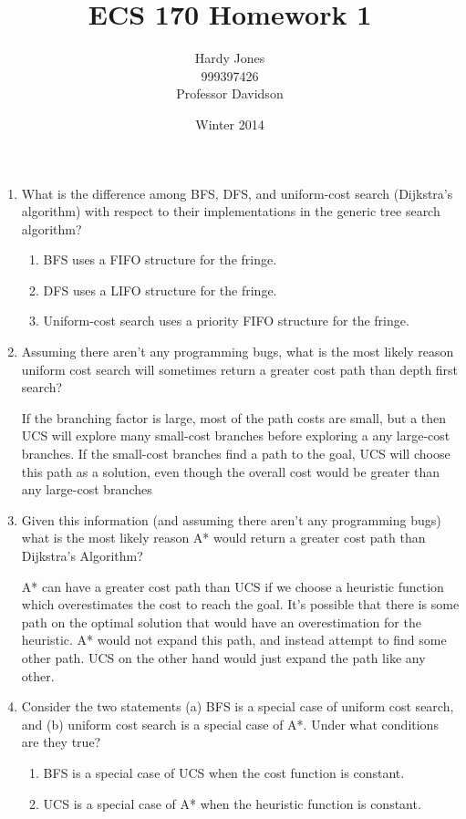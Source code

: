 \documentclass[12pt,letterpaper]{article}
\title{ECS 170 Homework 1\vspace{-2ex}}
\author{Hardy Jones\\
        999397426\\
        Professor Davidson\vspace{-2ex}}
\date{Winter 2014}
\begin{document}
  \maketitle

  \begin{enumerate}
    \item
      What is the difference among
      BFS, DFS, and uniform-cost search (Dijkstra's algorithm)
      with respect to their implementations in the generic tree search algorithm?

      \begin{enumerate}
        \item BFS uses a FIFO structure for the fringe.
        \item DFS uses a LIFO structure for the fringe.
        \item Uniform-cost search uses a priority FIFO structure for the fringe.
      \end{enumerate}
    \item
      Assuming there aren't any programming bugs,
      what is the most likely reason uniform cost search will sometimes return a greater cost path than depth first search?

      If the branching factor is large, most of the path costs are small, but a
      then UCS will explore many small-cost branches before exploring a any large-cost branches.
      If the small-cost branches find a path to the goal,
      UCS will choose this path as a solution,
      even though the overall cost would be greater than any large-cost branches
    \item
      Given this information (and assuming there aren't any programming bugs)
      what is the most likely reason A* would return a greater cost path
      than Dijkstra's Algorithm?

      A* can have a greater cost path than UCS
      if we choose a heuristic function which overestimates the cost to reach the goal.
      It's possible that there is some path on the optimal solution
      that would have an overestimation for the heuristic.
      A* would not expand this path,
      and instead attempt to find some other path.
      UCS on the other hand would just expand the path like any other.

    \item
      Consider the two statements
      (a) BFS is a special case of uniform cost search, and
      (b) uniform cost search is a special case of A*.
      Under what conditions are they true?

      \begin{enumerate}
        \item BFS is a special case of UCS when the cost function is constant.
        \item UCS is a special case of A* when the heuristic function is constant.
      \end{enumerate}
  \end{enumerate}
\end{document}

